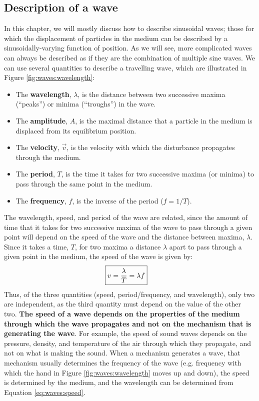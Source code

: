 \subsection{Description of a wave}
In this chapter, we will mostly discuss how to describe sinusoidal waves; those for which the displacement of particles in the medium can be described by a sinusoidally-varying function of position. As we will see, more complicated waves can always be described as if they are the combination of multiple sine waves. We can use several quantities to describe a travelling wave, which are illustrated in Figure \ref{fig:waves:wavelength}:
\begin{itemize}
\item The \textbf{wavelength}, $\lambda$, is the distance between two  successive maxima (``peaks'') or minima (``troughs'') in the wave.
\item The \textbf{amplitude}, $A$, is the maximal distance that a particle in the medium is displaced from its equilibrium position.
\item The \textbf{velocity}, $\vec v$, is the velocity with which the disturbance propagates through the medium.
\item The \textbf{period}, $T$, is the time it takes for two successive maxima (or minima) to pass through the same point in the medium.
\item The \textbf{frequency}, $f$, is the inverse of the period ($f=1/T$).
\end{itemize}
The wavelength, speed, and period of the wave are related, since the amount of time that it takes for two successive maxima of the wave to pass through a given point will depend on the speed of the wave and the distance between maxima, $\lambda$. Since it takes a time, $T$, for two maxima a distance $\lambda$ apart to pass through a given point in the medium, the speed of the wave is given by:
\begin{align}
\label{eq:waves:speed}
\Aboxed{v = \frac{\lambda}{T}=\lambda f}
\end{align}
Thus, of the three quantities (speed, period/frequency, and wavelength), only two are independent, as the third quantity must depend on the value of the other two. \textbf{The speed of a wave depends on the properties of the medium through which the wave propagates and not on the mechanism that is generating the wave}. For example, the speed of sound waves depends on the pressure, density, and temperature of the air through which they propagate, and not on what is making the sound. When a mechanism generates a wave, that mechanism usually determines the frequency of the wave (e.g. frequency with which the hand in Figure \ref{fig:waves:wavelength} moves up and down), the speed is determined by the medium, and the wavelength can be determined from Equation \ref{eq:waves:speed}.

